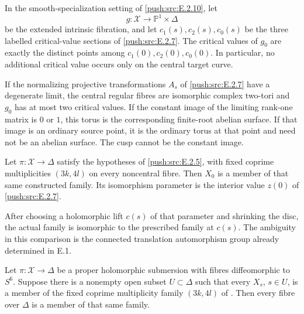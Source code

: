 \begin{proposition}\hypertarget{tag-032X}{}\label{push:src:E.2.12}


In the smooth-specialization setting of \ref{push:src:E.2.10}, let
\[
 g:\mathcal X\longrightarrow\mathbb P^1\times\Delta
\]
be the extended intrinsic fibration, and let
$c_1(s),c_2(s),c_0(s)$ be the three labelled critical-value
sections of \ref{push:src:E.2.7}.  The critical values of $g_0$ are exactly
the distinct points among $c_1(0),c_2(0),c_0(0)$.
In particular, no additional critical value occurs only
on the central target curve.

If the normalizing projective transformations $A_s$ of
\ref{push:src:E.2.7} have a degenerate limit, the central regular fibres
are isomorphic complex two-tori and $g_0$ has at most two
critical values.  If the constant image of the limiting
rank-one matrix is $0$ or $1$, this torus is the
corresponding finite-root abelian surface.  If that image
is an ordinary source point, it is the ordinary torus at
that point and need not be an abelian surface.  The cusp
cannot be the constant image.
\end{proposition}

\begin{proposition}\hypertarget{tag-0337}{}\label{push:src:E.2.21}


Let $\pi:\mathcal X\to\Delta$ satisfy the hypotheses of
\ref{push:src:E.2.5}, with fixed coprime multiplicities $(3k,4l)$ on
every noncentral fibre.  Then $X_0$ is a member of that
same constructed family.  Its isomorphism parameter is
the interior value $z(0)$ of \ref{push:src:E.2.7}.

After choosing a holomorphic lift $c(s)$ of that parameter
and shrinking the disc, the actual family is isomorphic
to the prescribed family at $c(s)$.  The ambiguity in
this comparison is the connected translation automorphism
group already determined in E.1.
\end{proposition}

\begin{proposition}\hypertarget{tag-0338}{}\label{push:src:E.2.22}


Let $\pi:\mathcal X\to\Delta$ be a proper holomorphic
submersion with fibres diffeomorphic to $S^6$.  Suppose
there is a nonempty open subset $U\subset\Delta$ such
that every $X_s$, $s\in U$, is a member of the fixed
coprime multiplicity family $(3k,4l)$ of .
Then every fibre over $\Delta$ is a member of that
same family.
\end{proposition}

